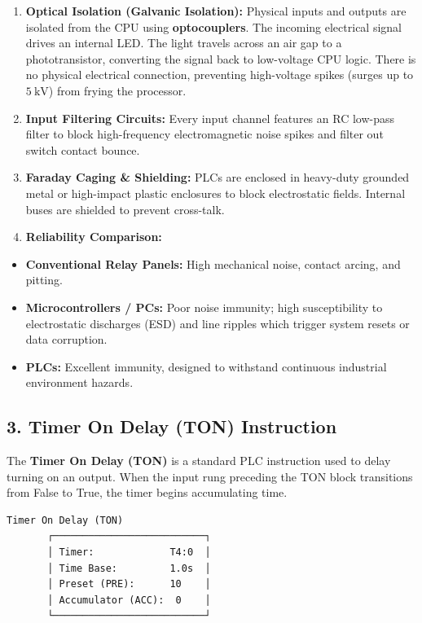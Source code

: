 \begin{enumerate}
  \item \textbf{Optical Isolation (Galvanic Isolation):} Physical inputs and outputs are isolated from the CPU using \textbf{optocouplers}. The incoming electrical signal drives an internal LED. The light travels across an air gap to a phototransistor, converting the signal back to low-voltage CPU logic. There is no physical electrical connection, preventing high-voltage spikes (surges up to $5\ \text{kV}$) from frying the processor.
  \item \textbf{Input Filtering Circuits:} Every input channel features an RC low-pass filter to block high-frequency electromagnetic noise spikes and filter out switch contact bounce.
  \item \textbf{Faraday Caging \& Shielding:} PLCs are enclosed in heavy-duty grounded metal or high-impact plastic enclosures to block electrostatic fields. Internal buses are shielded to prevent cross-talk.
  \item \textbf{Reliability Comparison:}
\end{enumerate}
\begin{itemize}
  \item   \textbf{Conventional Relay Panels:} High mechanical noise, contact arcing, and pitting.
  \item   \textbf{Microcontrollers / PCs:} Poor noise immunity; high susceptibility to electrostatic discharges (ESD) and line ripples which trigger system resets or data corruption.
  \item   \textbf{PLCs:} Excellent immunity, designed to withstand continuous industrial environment hazards.
\end{itemize}


\subsection{3. Timer On Delay (TON) Instruction}
The \textbf{Timer On Delay (TON)} is a standard PLC instruction used to delay turning on an output. When the input rung preceding the TON block transitions from False to True, the timer begins accumulating time.

\begin{lstlisting}
Timer On Delay (TON)
       ┌──────────────────────────┐
       │ Timer:             T4:0  │
       │ Time Base:         1.0s  │
       │ Preset (PRE):      10    │
       │ Accumulator (ACC):  0    │
       └──────────────────────────┘
\end{lstlisting}

